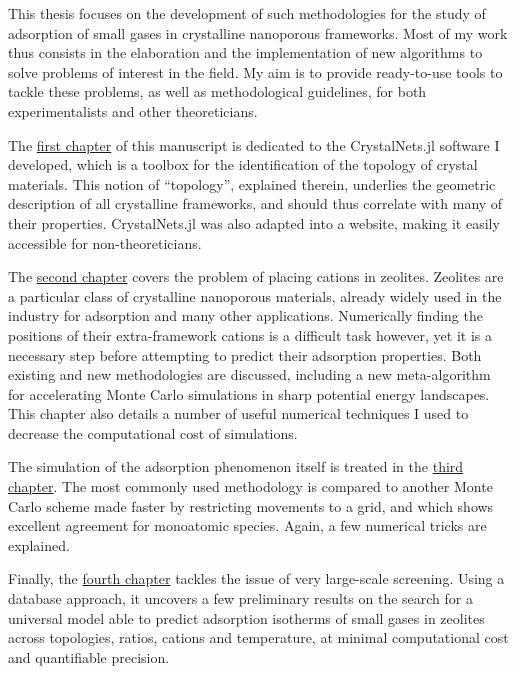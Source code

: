 \vspace{2em}

This thesis focuses on the development of such methodologies for the study of adsorption of small gases in crystalline nanoporous frameworks. Most of my work thus consists in the elaboration and the implementation of new algorithms to solve problems of interest in the field. My aim is to provide ready-to-use tools to tackle these problems, as well as methodological guidelines, for both experimentalists and other theoreticians.

The \hyperref[topology]{first chapter} of this manuscript is dedicated to the CrystalNets.jl software I developed, which is a toolbox for the identification of the topology of crystal materials. This notion of ``topology'', explained therein, underlies the geometric description of all crystalline frameworks, and should thus correlate with many of their properties. CrystalNets.jl was also adapted into a website, making it easily accessible for non-theoreticians.

The \hyperref[cationzeolites]{second chapter} covers the problem of placing cations in zeolites. Zeolites are a particular class of crystalline nanoporous materials, already widely used in the industry for adsorption and many other applications. Numerically finding the positions of their extra-framework cations is a difficult task however, yet it is a necessary step before attempting to predict their adsorption properties. Both existing and new methodologies are discussed, including a new meta-algorithm for accelerating Monte Carlo simulations in sharp potential energy landscapes. This chapter also details a number of useful numerical techniques I used to decrease the computational cost of simulations.

The simulation of the adsorption phenomenon itself is treated in the \hyperref[adsorption]{third chapter}. The most commonly used methodology is compared to another Monte Carlo scheme made faster by restricting movements to a grid, and which shows excellent agreement for monoatomic species. Again, a few numerical tricks are explained.

Finally, the \hyperref[database]{fourth chapter} tackles the issue of very large-scale screening. Using a database approach, it uncovers a few preliminary results on the search for a universal model able to predict adsorption isotherms of small gases in zeolites across topologies, \SiAl ratios, cations and temperature, at minimal computational cost and quantifiable precision.


\vfill
\begin{center}
\end{center}
\vfill\vfill
